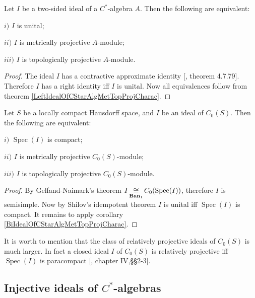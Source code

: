 \begin{corollary}\label{BiIdealOfCStarAlgMetTopProjCharac} Let $I$ be a two-sided ideal of a $C^*$-algebra $A$. Then the following are equivalent:

$i)$ $I$ is unital;

$ii)$ $I$ is metrically projective $A$-module;

$iii)$ $I$ is topologically projective $A$-module.
\end{corollary}
\begin{proof} The ideal $I$ has a contractive approximate identity [\cite{HelBanLocConvAlg}, theorem 4.7.79]. Therefore $I$ has a right identity iff $I$ is unital. Now all equivalences follow from theorem \ref{LeftIdealOfCStarAlgMetTopProjCharac}. 
\end{proof}

\begin{corollary}\label{IdealofCommCStarAlgMetTopProjCharac} Let $S$ be a locally compact Hausdorff space, and $I$ be an ideal of $C_0(S)$. Then the following are equivalent:

$i)$ $\operatorname{Spec}(I)$ is compact;

$ii)$ $I$ is metrically projective $C_0(S)$-module;

$iii)$ $I$ is topologically projective $C_0(S)$-module.
\end{corollary}
\begin{proof} By Gelfand-Naimark's theorem $I\mathop{\mathbin{\cong}}\limits_{\mathbf{Ban}_1}C_0(\operatorname{Spec}(I))$, therefore $I$ is semisimple. Now by Shilov's idempotent theorem $I$ is unital iff $\operatorname{Spec}(I)$ is compact. It remains to apply corollary \ref{BiIdealOfCStarAlgMetTopProjCharac}. 
\end{proof}

It is worth to mention that the class of relatively projective ideals of $C_0(S)$ is much larger. In fact a closed ideal $I$ of $C_0(S)$ is relatively projective iff $\operatorname{Spec}(I)$ is paracompact [\cite{HelHomolBanTopAlg}, chapter IV,\S\S 2-3].


\subsection{Injective ideals of \texorpdfstring{$C^*$}{C*}-algebras}
\label{SubSectionInjectiveIdealsOfCStarAlgebras}

